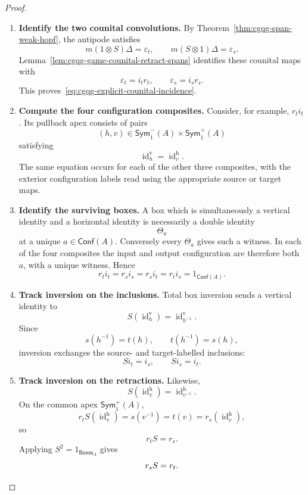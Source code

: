 \documentclass[oneside]{article}
\newcommand{\Boxes}{\mathsf{Boxes}}
\newcommand{\Conf}{\mathsf{Conf}}
\newcommand{\Sym}{\mathsf{Sym}}
\newcommand{\id}{\operatorname{id}}
\theoremstyle{plain}
\theoremstyle{definition}
\theoremstyle{remark}
\begin{document}
\begin{proof}
    \leavevmode
    \begin{enumerate}[beginpenalty=10000]
        \item \textbf{Identify the two counital convolutions.} By Theorem~\ref{thm:cgqg-span-weak-hopf}, the antipode satisfies
        \[
            m(1\otimes S)\Delta=\varepsilon_t,
            \qquad
            m(S\otimes1)\Delta=\varepsilon_s.
        \]
        Lemma~\ref{lem:cgqg-game-counital-retract-spans} identifies these counital maps with
        \[
            \varepsilon_t=i_tr_t,
            \qquad
            \varepsilon_s=i_sr_s.
        \]
        This proves~\eqref{eq:cgqg-explicit-counital-incidence}.

        \item \textbf{Compute the four configuration composites.} Consider, for example, \(r_ti_t\). Its pullback apex consists of pairs
        \[
            (h,v)\in\Sym^-_1(A)\times\Sym^+_1(A)
        \]
        satisfying
        \[
            \id_h^{\mathrm v}
            =
            \id_v^{\mathrm h}.
        \]
        The same equation occurs for each of the other three composites, with the exterior configuration labels read using the appropriate source or target maps.

        \item \textbf{Identify the surviving boxes.} A box which is simultaneously a vertical identity and a horizontal identity is necessarily a double identity
        \[
            \Theta_a
        \]
        at a unique \(a\in\Conf(A)\). Conversely every \(\Theta_a\) gives such a witness. In each of the four composites the input and output configuration are therefore both \(a\), with a unique witness. Hence
        \[
            r_ti_t
            =
            r_si_s
            =
            r_si_t
            =
            r_ti_s
            =
            1_{\Conf(A)}.
        \]

        \item \textbf{Track inversion on the inclusions.} Total box inversion sends a vertical identity to
        \[
            S(\id_h^{\mathrm v})
            =
            \id_{h^{-1}}^{\mathrm v}.
        \]
        Since
        \[
            s(h^{-1})=t(h),
            \qquad
            t(h^{-1})=s(h),
        \]
        inversion exchanges the source- and target-labelled inclusions:
        \[
            Si_t=i_s,
            \qquad
            Si_s=i_t.
        \]

        \item \textbf{Track inversion on the retractions.} Likewise,
        \[
            S(\id_v^{\mathrm h})
            =
            \id_{v^{-1}}^{\mathrm h}.
        \]
        On the common apex \(\Sym^+_1(A)\),
        \[
            r_tS(\id_v^{\mathrm h})
            =
            s(v^{-1})
            =
            t(v)
            =
            r_s(\id_v^{\mathrm h}),
        \]
        so
        \[
            r_tS=r_s.
        \]
        Applying \(S^2=1_{\Boxes_A}\) gives
        \[
            r_sS=r_t.\qedhere
        \]
    \end{enumerate}
\end{proof}
\end{document}
